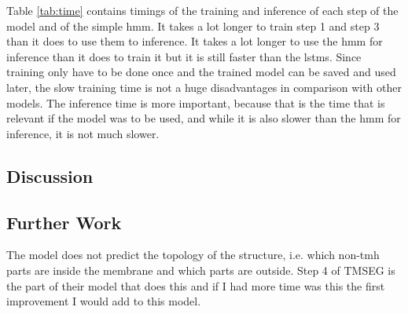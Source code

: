 Table \ref{tab:time} contains timings of the training and inference of each 
step of the model and of the simple \gls{hmm}. It takes a lot longer to train 
step 1 and step 3 than it does to use them to inference. 
It takes a lot longer to use the \gls{hmm} for inference than it does to train
it but it is still faster than the \glspl{lstm}. Since training only have to be
done once and the trained model can be saved and used later, the slow training 
time is not a huge disadvantages in comparison with other models. The inference
time is more important, because that is the time that is relevant if the model 
was to be used, and while it is also slower than the \gls{hmm} for inference,
it is not much slower.

\subsection{Discussion}


\subsection{Further Work}
The model does not predict the topology of the structure, i.e. which 
non-\gls{tmh} parts are inside the membrane and which parts are outside.
Step 4 of TMSEG is the part of their model that does this and if I had more
time was this the first improvement I would add to this model.


